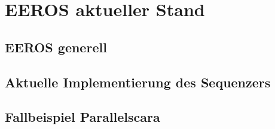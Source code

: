 \chapter{EEROS aktueller Stand}


\section{EEROS generell}



\section{Aktuelle Implementierung des Sequenzers}



\section{Fallbeispiel Parallelscara}
